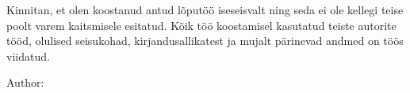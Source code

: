 Kinnitan, et olen koostanud antud lõputöö iseseisvalt ning seda ei ole kellegi teise poolt
varem kaitsmisele esitatud. Kõik töö koostamisel kasutatud teiste autorite tööd, olulised
seisukohad, kirjandusallikatest ja mujalt pärinevad andmed on töös viidatud.

\begin{flushleft}

Author:~\authorName\\
\vspace*{0.5cm}
\signatureDate
 
\end{flushleft}
